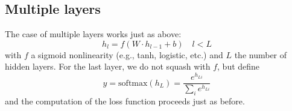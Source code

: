 \documentclass[10pt]{article}
\begin{document}
\subsection{Multiple layers}
The case of multiple layers works just as above:
\begin{equation}
    h_l = f(W \cdot h_{l-1} + b) \quad l < L
\end{equation}
with $f$ a sigmoid nonlinearity (e.g., tanh, logistic, etc.) and $L$ the number of hidden layers. For the last layer, we do not squash with $f$, but define
\begin{equation}
    y = \mathrm{softmax}(h_L) = \frac{e^{h_{Li}}}{\sum_i e^{h_{Li}}}
\end{equation}
and the computation of the loss function proceeds just as before.
\end{document}
